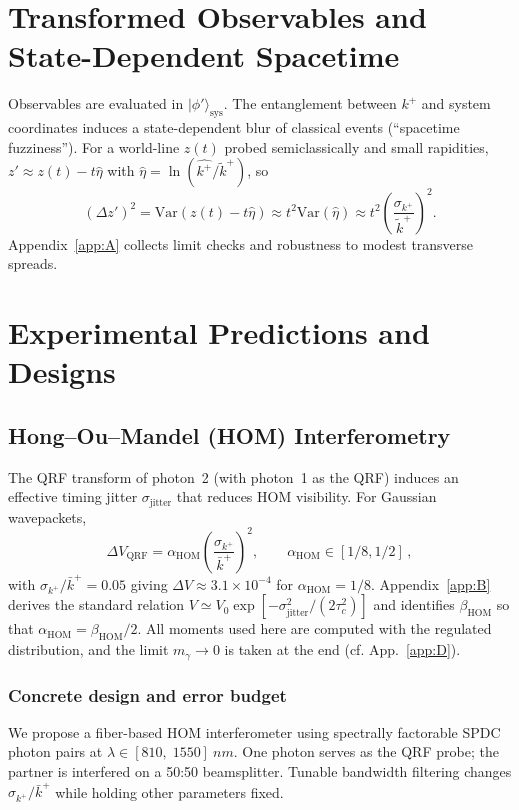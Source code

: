 \documentclass[aps,11pt]{article}
\providecommand{\ket}[1]{|#1\rangle}
\newcommand{\Var}{\mathrm{Var}}
\newcommand{\kplus}{k^{+}}
\newcommand{\kbar}{\bar{k}^{+}}
\newcommand{\ktil}{\tilde{k}^{+}}
\newcommand{\alphahom}{\alpha_{\text{HOM}}}
\newcommand{\betahom}{\beta_{\text{HOM}}}
\begin{document}
\section{Transformed Observables and State-Dependent Spacetime}\label{sec:operators}
Observables are evaluated in \(\ket{\phi'}_{\mathrm{sys}}\). The entanglement between \(\kplus\) and system coordinates induces a state-dependent blur of classical events (“spacetime fuzziness”). For a world-line \(z(t)\) probed semiclassically and small rapidities, \(z'\approx z(t)-t\hat\eta\) with \(\hat\eta=\ln(\hat{\kplus}/\ktil)\), so
\begin{equation}\label{eq:dzvar}
(\Delta z')^{2} = \Var(z(t)-t\hat\eta)\approx t^{2}\Var(\hat\eta)\approx t^{2}\left(\frac{\sigma_{\kplus}}{\ktil}\right)^{2}\!.
\end{equation}
Appendix~\ref{app:A} collects limit checks and robustness to modest transverse spreads.

\section{Experimental Predictions and Designs}\label{sec:experiments}

\subsection{Hong--Ou--Mandel (HOM) Interferometry}\label{sec:HOM}
The QRF transform of photon~2 (with photon~1 as the QRF) induces an effective timing jitter \(\sigma_{\mathrm{jitter}}\) that reduces HOM visibility. For Gaussian wavepackets,
\begin{equation}
\Delta V_{\text{QRF}}=\alphahom\!\left(\frac{\sigma_{\kplus}}{\kbar}\right)^{2}, \qquad \alphahom\in[1/8,1/2]\,,
\end{equation}
with \(\sigma_{\kplus}/\kbar=0.05\) giving \(\Delta V\approx 3.1\times 10^{-4}\) for \(\alphahom=1/8\). Appendix~\ref{app:B} derives the standard relation \(V\simeq V_0\exp[-\sigma_{\mathrm{jitter}}^{2}/(2\tau_c^2)]\) and identifies \(\betahom\) so that \(\alphahom=\betahom/2\). All moments used here are computed with the regulated distribution, and the limit \(m_\gamma\to0\) is taken at the end (cf. App.~\ref{app:D}).

\subsubsection*{Concrete design and error budget}
We propose a fiber-based HOM interferometer using spectrally factorable SPDC photon pairs at \(\lambda\in[810,\;1550]~\si{nm}\). One photon serves as the QRF probe; the partner is interfered on a 50:50 beamsplitter. Tunable bandwidth filtering changes \(\sigma_{\kplus}/\kbar\) while holding other parameters fixed.
\end{document}
